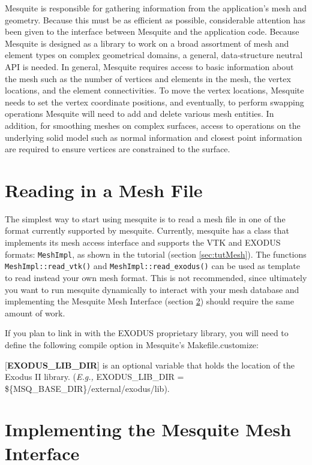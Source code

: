\documentclass[letter]{report}
\begin{document}
Mesquite is responsible for gathering information from the
application's mesh and geometry.  Because this must be as efficient as
possible, considerable attention has been given to the interface
between Mesquite and the application code.  Because Mesquite is
designed as a library to work on a broad assortment of mesh and
element types on complex geometrical domains, a general,
data-structure neutral API is needed.  In general, Mesquite requires
access to basic information about the mesh such as the number of
vertices and elements in the mesh, the vertex locations, and the
element connectivities.  To move the vertex locations, Mesquite needs
to set the vertex coordinate positions, and eventually, to perform
swapping operations Mesquite will need to add and delete various mesh
entities.  In addition, for smoothing meshes on complex surfaces,
access to operations on the underlying solid model such as normal
information and closest point information are required to ensure
vertices are constrained to the surface.

\section{Reading in a Mesh File}

The simplest way to start using mesquite is to read a mesh file in one of the format currently
supported by mesquite. Currently, mesquite has a class that implements its mesh access interface and
supports the VTK \cite{VTKbook, VTKuml} and EXODUS formats: \texttt{MeshImpl}, as shown in the tutorial (section
\ref{sec:tutMesh}). The functions \texttt{MeshImpl::read\_vtk()}
and \texttt{MeshImpl::read\_exodus()} can be used as template to read instead your own mesh format. This is not
recommended, since ultimately you want to run mesquite dynamically to interact with your mesh
database and implementing the Mesquite Mesh Interface (section \ref{sec:msq_mesh}) should require the same amount of work. 

If you plan to link in with the EXODUS proprietary library, you will need to define the following
compile option in Mesquite's Makefile.customize: 

  [{\bf EXODUS\_LIB\_DIR}] is an optional variable that holds the location of the Exodus II library. 
({\it E.g.,} EXODUS\_LIB\_DIR = \$\{MSQ\_BASE\_DIR\}/external/exodus/lib).

\section{Implementing the Mesquite Mesh Interface} \label{sec:msq_mesh}
\end{document}
